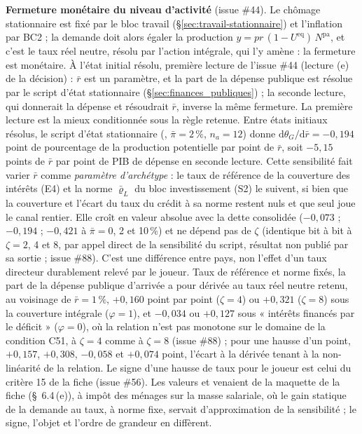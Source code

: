 \documentclass[11pt,a4paper]{article}
\newcommand{\code}[1]{\texttt{\detokenize{#1}}}
\newcommand{\barre}[1]{\leavevmode\sbox{\boitebarre}{#1}\rlap{\rule[0.6ex]{\wd\boitebarre}{0.4pt}}\usebox{\boitebarre}}
\begin{document}
\begin{proposee}
\textbf{Fermeture monétaire du niveau d'activité} (issue \#44). Le chômage stationnaire est fixé par le bloc travail (\S\ref{sec:travail-stationnaire}) et l'inflation par BC2 ; la demande doit alors égaler la production $y = \mathit{pr}\,(1 - U^{\mathrm{eq}})\,N^{\mathrm{pa}}$, et c'est le taux réel neutre, résolu par l'action intégrale, qui l'y amène : la fermeture est monétaire. À l'état initial résolu, première lecture de l'issue \#44 (lecture (e) de la décision) : $\bar r$ est un paramètre, et la part de la dépense publique est résolue par le script d'état stationnaire (\S\ref{sec:finances_publiques}) ; la seconde lecture, qui donnerait la dépense et résoudrait $\bar r$, inverse la même fermeture. La première lecture est la mieux conditionnée sous la règle retenue. Entre états initiaux résolus, le script d'état stationnaire (\code{outils/etat_stationnaire.py}, $\bar\pi = 2\,\%$, $n_a = 12$) donne $\mathrm{d}\theta_G/\mathrm{d}\bar r = -0{,}194$ point de pourcentage de la production potentielle par point de $\bar r$, soit $-5{,}15$ points de $\bar r$ par point de PIB de dépense en seconde lecture. Cette sensibilité fait varier $\bar r$ comme \emph{paramètre d'archétype} : le taux de référence de la couverture des intérêts (E4) et la norme $\bar\varrho_L$ du bloc investissement (S2) le suivent, si bien que la couverture et l'écart du taux du crédit à sa norme restent nuls et que seul joue le canal rentier. Elle croît en valeur absolue avec la dette consolidée ($-0{,}073$ ; $-0{,}194$ ; $-0{,}421$ à $\bar\pi = 0$, 2 et 10\,\%) et ne dépend pas de $\zeta$ (identique bit à bit à $\zeta = 2$, 4 et 8, par appel direct de la sensibilité du script, résultat non publié par sa sortie ; issue \#88). C'est une différence entre pays, non l'effet d'un taux directeur durablement relevé par le joueur. Taux de référence et norme fixés, la part de la dépense publique d'arrivée a pour dérivée au taux réel neutre retenu, au voisinage de $\bar r = 1\,\%$, $+0{,}160$ point par point ($\zeta = 4$) ou $+0{,}321$ ($\zeta = 8$) sous la couverture intégrale ($\varphi = 1$), et $-0{,}034$ ou $+0{,}127$ sous « intérêts financés par le déficit » ($\varphi = 0$), où la relation n'est pas monotone sur le domaine de la condition C51, à $\zeta = 4$ comme à $\zeta = 8$ (issue \#88) ; pour une hausse d'un point, $+0{,}157$, $+0{,}308$, $-0{,}058$ et $+0{,}074$ point, l'écart à la dérivée tenant à la non-linéarité de la relation. Le signe d'une hausse de taux pour le joueur est celui du critère 15 de la fiche (issue \#56). Les valeurs \barre{0,026\,\%} et \barre{38 points} venaient de la maquette de la fiche (\S~6.4\,(e)), à impôt des ménages sur la masse salariale, où le gain statique de la demande au taux, à norme fixe, servait d'approximation de la sensibilité ; le signe, l'objet et l'ordre de grandeur en diffèrent.


\end{proposee}
\end{document}
